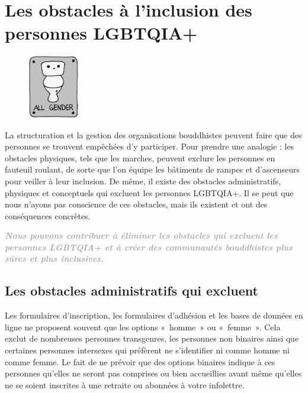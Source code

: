 \documentclass[12pt,openany]{book}
\renewenvironment{quote}{%
  \list{}{%
    \leftmargin-0.1cm   %
    \rightmargin\leftmargin
  }
  \item\relax
}
{\endlist}
\begin{document}
\chapter*{Les obstacles à l’inclusion des personnes \mbox{LGBTQIA+}}

\begin{figure}
    \centering
    \includegraphics[width=0.2\textwidth]{16bw.png}
\end{figure}
La structuration et la gestion des organisations bouddhistes peuvent faire que des personnes se trouvent empêchées d’y participer. Pour prendre une analogie : les obstacles physiques, tels que les marches, peuvent exclure les personnes en fauteuil roulant, de sorte que l’on équipe les bâtiments de rampes et d’ascenseurs pour veiller à leur inclusion. De même, il existe des obstacles administratifs, physiques et conceptuels qui excluent les personnes \mbox{LGBTQIA+}. Il se peut que nous n’ayons pas conscience de ces obstacles, mais ils existent et ont des conséquences concrètes.

\begingroup
\begin{quote}
\doublespacing
\centering
\textit{\Large \textbf{\textcolor{darkgray}{Nous pouvons contribuer à éliminer les obstacles qui excluent les personnes \mbox{LGBTQIA+} et à créer des communautés bouddhistes plus sûres et plus inclusives.}}}
\end{quote}
\endgroup

\section*{Les obstacles administratifs qui excluent}

\noindent Les formulaires d’inscription, les formulaires d’adhésion et les bases de données en ligne ne proposent souvent que les options \mbox{« homme »} ou \mbox{« femme »}. Cela exclut de nombreuses personnes transgenres, les personnes non binaires ainsi que certaines personnes intersexes qui préfèrent ne s’identifier ni comme homme ni comme femme. Le fait de ne prévoir que des options binaires indique à ces personnes qu’elles ne seront pas comprises ou bien accueillies avant même qu’elles ne se soient inscrites à une retraite ou abonnées à votre infolettre.
\end{document}
